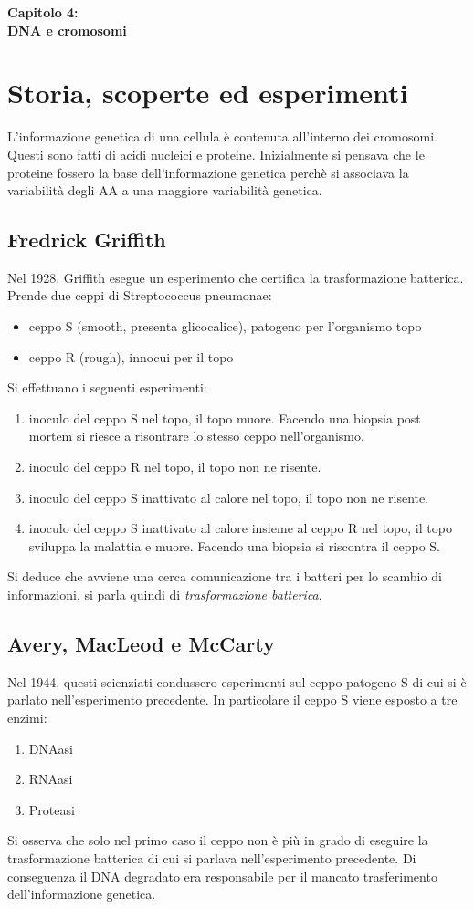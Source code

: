 \Huge\textbf{Capitolo 4: \\DNA e cromosomi}
\small
\section{Storia, scoperte ed esperimenti}
    L'informazione genetica di una cellula è contenuta all'interno dei cromosomi. Questi sono fatti di acidi nucleici e proteine. Inizialmente si pensava che le proteine fossero la base dell'informazione genetica perchè si associava la variabilità degli AA a una maggiore variabilità genetica.
    \subsection{Fredrick Griffith}
        Nel 1928, Griffith esegue un esperimento che certifica la trasformazione batterica. Prende due ceppi di Streptococcus pneumonae:
        \begin{itemize}
            \item ceppo S (smooth, presenta glicocalice), patogeno per l'organismo topo
            \item ceppo R (rough), innocui per il topo
        \end{itemize}
        Si effettuano i seguenti esperimenti:
        \begin{enumerate}
            \item inoculo del ceppo S nel topo, il topo muore. Facendo una biopsia post mortem si riesce a risontrare lo stesso ceppo nell'organismo.
            \item inoculo del ceppo R nel topo, il topo non ne risente.
            \item inoculo del ceppo S inattivato al calore nel topo, il topo non ne risente.
            \item inoculo del ceppo S inattivato al calore insieme al ceppo R nel topo, il topo sviluppa la malattia e muore. Facendo una biopsia si riscontra il ceppo S.
        \end{enumerate}
        Si deduce che avviene una cerca comunicazione tra i batteri per lo scambio di informazioni, si parla quindi di \textit{trasformazione batterica}.
        
    \subsection{Avery, MacLeod e McCarty}
        Nel 1944, questi scienziati condussero esperimenti sul ceppo patogeno S di cui si è parlato nell'esperimento precedente. In particolare il ceppo S viene esposto a tre enzimi:
        \begin{enumerate}
            \item DNAasi
            \item RNAasi
            \item Proteasi
        \end{enumerate}
        Si osserva che solo nel primo caso il ceppo non è più in grado di eseguire la trasformazione batterica di cui si parlava nell'esperimento precedente. Di conseguenza il DNA degradato era responsabile per il mancato trasferimento dell'informazione genetica.
    
